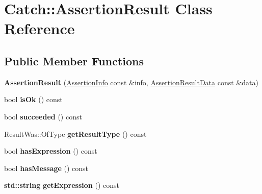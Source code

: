 \hypertarget{class_catch_1_1_assertion_result}{}\section{Catch\+:\+:Assertion\+Result Class Reference}
\label{class_catch_1_1_assertion_result}
\subsection*{Public Member Functions}
\begin{DoxyCompactItemize}
\item 
\mbox{\label{class_catch_1_1_assertion_result_ab58aeec27052ba400633ed0e36cea692}} 
{\bfseries Assertion\+Result} (\hyperlink{struct_catch_1_1_assertion_info}{Assertion\+Info} const \&info, \hyperlink{struct_catch_1_1_assertion_result_data}{Assertion\+Result\+Data} const \&data)
\item 
\mbox{\label{class_catch_1_1_assertion_result_ae39658b71c4afc3c8a859043b0e97027}} 
bool {\bfseries is\+Ok} () const
\item 
\mbox{\label{class_catch_1_1_assertion_result_ac5cc872b721d5fb65d87221d30b22fdd}} 
bool {\bfseries succeeded} () const
\item 
\mbox{\label{class_catch_1_1_assertion_result_ac810750194e1722489d2fd16e8c6a4a8}} 
Result\+Was\+::\+Of\+Type {\bfseries get\+Result\+Type} () const
\item 
\mbox{\label{class_catch_1_1_assertion_result_aba37b4fef1015989df2136592958e984}} 
bool {\bfseries has\+Expression} () const
\item 
\mbox{\label{class_catch_1_1_assertion_result_aae37064b401919fa8ac480ef86cca924}} 
bool {\bfseries has\+Message} () const
\item 
\mbox{\label{class_catch_1_1_assertion_result_a26a777f3959353c729544cb2ace0d279}} 
\textbf{ std\+::string} {\bfseries get\+Expression} () const
\item 

\end{DoxyCompactItemize}
